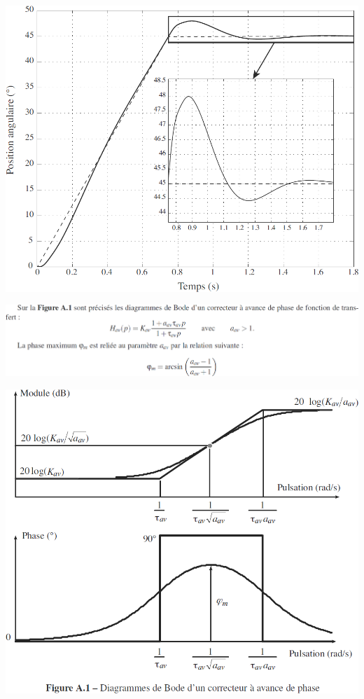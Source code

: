 \begin{multicols}{2}
\begin{multicols}{2}
\begin{center}
\includegraphics[width=.6\linewidth]{images/pt_33}
\end{center}

\begin{center}
\includegraphics[width=\linewidth]{images/pt_ann_01}

\includegraphics[width=.9\linewidth]{images/pt_ann_02}
\end{center}


\ifprof
\end{multicols}
\else
\end{multicols}
\fi


